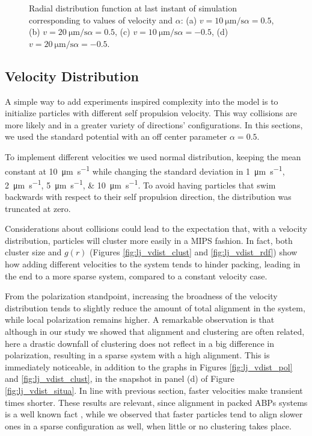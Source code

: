 \documentclass[../../master_thesis_np.tex]{subfiles}
\begin{document}
\begin{figure}[hbtp]
			\caption{Radial distribution function at last instant of simulation corresponding to values of velocity and $\alpha$: (a) $v = \SI{10}{\um \per \second} \alpha = 0.5$, (b) $v = \SI{20}{\um \per \second} \alpha = 0.5$, (c) $v = \SI{10}{\um \per \second} \alpha = -0.5$, (d) $v = \SI{20}{\um \per \second} \alpha = -0.5$.}
			\label{fig:lj_velocity_rdf}
		\end{figure}

		\subsection{Velocity Distribution}
		\label{veldist}
		A simple way to add experiments inspired complexity into the model is to initialize particles with different self propulsion velocity. 
		This way collisions are more likely and in a greater variety of directions' configurations.
		In this sections, we used the standard potential with an off center parameter $\alpha = 0.5$.
		
		To implement different velocities we used normal distribution, keeping the mean constant at \SI{10}{\um \per \second} while changing the standard deviation in \qtylist{1; 2; 5; 10}{\um \per \second}.
		To avoid having particles that swim backwards with respect to their self propulsion direction, the distribution was truncated at zero.
		
		Considerations about collisions could lead to the expectation that, with a velocity distribution, particles will cluster more easily in a MIPS fashion.
		In fact, both cluster size and $g(r)$ (Figures \ref{fig:lj_vdist_clust} and \ref{fig:lj_vdist_rdf}) show how adding different velocities to the system tends to hinder packing, leading in the end to a more sparse system, compared to a constant velocity case.
		
		From the polarization standpoint, increasing the broadness of the velocity distribution tends to slightly reduce the amount of total alignment in the system, while local polarization remains higher. 
		A remarkable observation is that although in our study we showed that alignment and clustering are often related, here a drastic downfall of clustering does not reflect in a big difference in polarization, resulting in a sparse system with a high alignment.
		This is immediately noticeable, in addition to the graphs in Figures \ref{fig:lj_vdist_pol} and \ref{fig:lj_vdist_clust}, in the snapshot in panel (d) of Figure \ref{fig:lj_vdist_situa}.
		In line with previous section, faster velocities make transient times shorter.
		These results are relevant, since alignment in packed ABPs systems is a well known fact \cite{caprini_spontaneous_2020}, while we observed that faster particles tend to align slower ones in a sparse configuration as well, when little or no clustering takes place.
		
\end{document}
